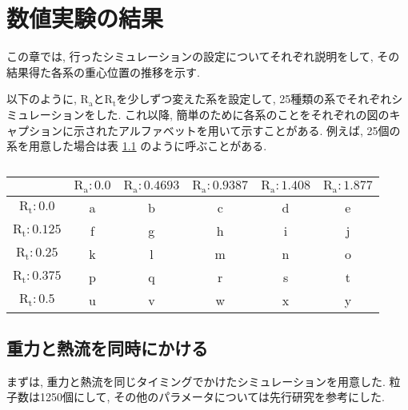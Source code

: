 \chapter{数値実験の結果}\label{chap:simulation}

この章では, 行ったシミュレーションの設定についてそれぞれ説明をして, その結果得た各系の重心位置の推移を示す.

以下のように, $\text{R}_\text{a}$と$\text{R}_\text{t}$を少しずつ変えた系を設定して, 25種類の系でそれぞれシミュレーションをした. これ以降, 簡単のために各系のことをそれぞれの図のキャプションに示されたアルファベットを用いて示すことがある. 例えば, 25個の系を用意した場合は表 \ref{tb:system} のように呼ぶことがある. 

\vspace{1\baselineskip}

\begin{table}
  \centering
  \begin{tabular}{|c|c|c|c|c|c|} \hline
          & $\text{R}_\text{a}:0.0$ & $\text{R}_\text{a}:0.4693$ & $\text{R}_\text{a}:0.9387$ & $\text{R}_\text{a}:1.408$ & $\text{R}_\text{a}:1.877$ \\ \hline
    $\text{R}_\text{t}:0.0$ & a      & b      & c      & d      & e     \\ \hline
    $\text{R}_\text{t}:0.125$ & f      & g      & h      & i      & j     \\ \hline
    $\text{R}_\text{t}:0.25$ & k      & l      & m      & n      & o     \\ \hline
    $\text{R}_\text{t}:0.375$ & p      & q      & r      & s      & t     \\ \hline
    $\text{R}_\text{t}:0.5$ & u      & v      & w      & x      & y     \\ \hline
  \end{tabular} 
  \caption{}
  \label{tb:system}
\end{table}

\section{重力と熱流を同時にかける}\label{sec:RaRtmap}

\vspace{1\baselineskip}

まずは, 重力と熱流を同じタイミングでかけたシミュレーションを用意した. 粒子数は1250個にして, その他のパラメータについては先行研究\cite{Yoshida}を参考にした. 

